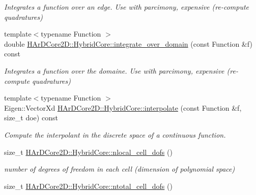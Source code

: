 \begin{DoxyCompactItemize}
\begin{DoxyCompactList}\small\item\em Integrates a function over an edge. Use with parcimony, expensive (re-\/compute quadratures) \end{DoxyCompactList}\item 
\mbox{\label{group__HybridCore_gab058c4e54d1e33c49e537b8d0f602848}} 
{\footnotesize template$<$typename Function $>$ }\\double \hyperlink{group__HybridCore_gab058c4e54d1e33c49e537b8d0f602848}{H\+Ar\+D\+Core2\+D\+::\+Hybrid\+Core\+::integrate\+\_\+over\+\_\+domain} (const Function \&f) const
\begin{DoxyCompactList}\small\item\em Integrates a function over the domaine. Use with parcimony, expensive (re-\/compute quadratures) \end{DoxyCompactList}\item 
\mbox{\label{group__HybridCore_ga71c953efc96f467cb24faa1b60ee9bb2}} 
{\footnotesize template$<$typename Function $>$ }\\Eigen\+::\+Vector\+Xd \hyperlink{group__HybridCore_ga71c953efc96f467cb24faa1b60ee9bb2}{H\+Ar\+D\+Core2\+D\+::\+Hybrid\+Core\+::interpolate} (const Function \&f, size\+\_\+t doe) const
\begin{DoxyCompactList}\small\item\em Compute the interpolant in the discrete space of a continuous function. \end{DoxyCompactList}\item 
\mbox{\label{group__HybridCore_ga6faceb46cc896cd6d82a821828518730}} 
size\+\_\+t \hyperlink{group__HybridCore_ga6faceb46cc896cd6d82a821828518730}{H\+Ar\+D\+Core2\+D\+::\+Hybrid\+Core\+::nlocal\+\_\+cell\+\_\+dofs} ()
\begin{DoxyCompactList}\small\item\em number of degrees of freedom in each cell (dimension of polynomial space) \end{DoxyCompactList}\item 
\mbox{\label{group__HybridCore_gaf97e3efcc37ac51074c7136af3ca517b}} 
size\+\_\+t \hyperlink{group__HybridCore_gaf97e3efcc37ac51074c7136af3ca517b}{H\+Ar\+D\+Core2\+D\+::\+Hybrid\+Core\+::ntotal\+\_\+cell\+\_\+dofs} ()

\end{DoxyCompactItemize}
